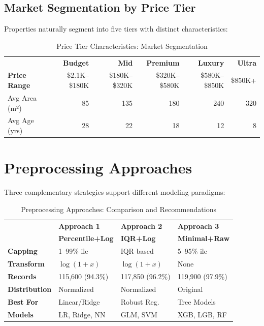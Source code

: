 \documentclass[12pt,a4paper]{article}
\begin{document}
\subsection{Market Segmentation by Price Tier}

Properties naturally segment into five tiers with distinct characteristics:

\begin{table}[H]
\centering\small
\begin{tabular}{lrrrrr}
\toprule
& \textbf{Budget} & \textbf{Mid} & \textbf{Premium} & \textbf{Luxury} & \textbf{Ultra} \\
\textbf{Price Range} & \$2.1K--\$180K & \$180K--\$320K & \$320K--\$580K & \$580K--\$850K & \$850K+ \\
Avg Area (m²) & 85 & 135 & 180 & 240 & 320 \\
Avg Age (yrs) & 28 & 22 & 18 & 12 & 8 \\
\bottomrule
\end{tabular}
\caption{Price Tier Characteristics: Market Segmentation}
\end{table}

\section{Preprocessing Approaches}

Three complementary strategies support different modeling paradigms:

\begin{table}[H]
\centering\small
\begin{tabular}{llll}
\toprule
& \textbf{Approach 1} & \textbf{Approach 2} & \textbf{Approach 3} \\
& \textbf{Percentile+Log} & \textbf{IQR+Log} & \textbf{Minimal+Raw} \\
\midrule
\textbf{Capping} & 1--99\% ile & IQR-based & 5--95\% ile \\
\textbf{Transform} & $\log(1+x)$ & $\log(1+x)$ & None \\
\textbf{Records} & 115,600 (94.3\%) & 117,850 (96.2\%) & 119,900 (97.9\%) \\
\textbf{Distribution} & Normalized & Normalized & Original \\
\textbf{Best For} & Linear/Ridge & Robust Reg. & Tree Models \\
\textbf{Models} & LR, Ridge, NN & GLM, SVM & XGB, LGB, RF \\
\bottomrule
\end{tabular}
\caption{Preprocessing Approaches: Comparison and Recommendations}
\end{table}
\end{document}
